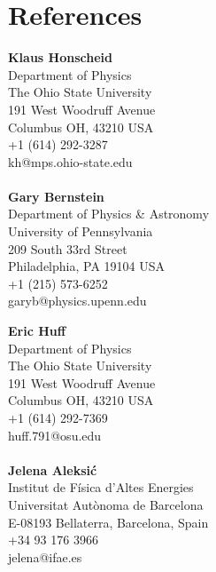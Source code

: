 \documentclass[12pt,a4paper,sans]{moderncv}	%
\begin{document}



\section{References}
\begin{minipage}{0.48\textwidth}
\textbf{Klaus Honscheid} \\
Department of Physics \\
The Ohio State University \\
191 West Woodruff Avenue \\
Columbus OH, 43210 USA \\
+1 (614) 292-3287 \\
kh@mps.ohio-state.edu \\
\\
\textbf{Gary Bernstein} \\
Department of Physics \& Astronomy \\
University of Pennsylvania \\
209 South 33rd Street \\
Philadelphia, PA 19104 USA \\ 
+1 (215) 573-6252 \\
garyb@physics.upenn.edu
\end{minipage}%
%
\begin{minipage}{0.48\textwidth}
\textbf{Eric Huff} \\
Department of Physics \\
The Ohio State University \\
191 West Woodruff Avenue \\
Columbus OH, 43210 USA \\
+1 (614) 292-7369 \\
huff.791@osu.edu \\
\\
\textbf{Jelena Aleksi\'c} \\
Institut de F\'isica d'Altes Energies \\
Universitat Aut\`onoma de Barcelona \\
E-08193 Bellaterra, Barcelona, Spain \\
+34 93 176 3966 \\
jelena@ifae.es \\
\end{minipage}


\end{document}
